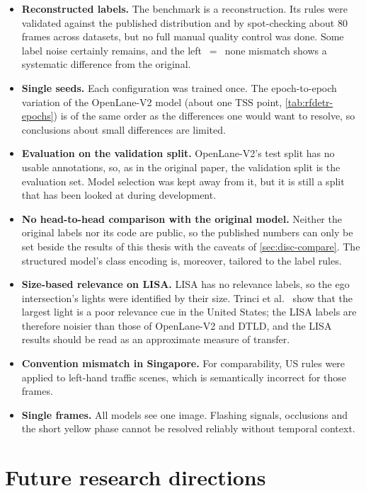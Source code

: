 \begin{itemize}
  \item \textbf{Reconstructed labels.} The benchmark is a reconstruction. Its rules were validated against
        the published distribution and by spot-checking about 80 frames across datasets, but no full
        manual quality control was done. Some label noise certainly remains, and the left~$=$~none
        mismatch shows a systematic difference from the original.
  \item \textbf{Single seeds.} Each configuration was trained once. The epoch-to-epoch variation of the
        OpenLane-V2 model (about one TSS point, \cref{tab:rfdetr-epochs}) is of the same order as the
        differences one would want to resolve, so conclusions about small differences are limited.
  \item \textbf{Evaluation on the validation split.} OpenLane-V2's test split has no usable annotations,
        so, as in the original paper, the validation split is the evaluation set. Model selection was
        kept away from it, but it is still a split that has been looked at during development.
  \item \textbf{No head-to-head comparison with the original model.} Neither the original labels nor
        its code are public, so the published numbers can only be set beside the results of this thesis
        with the caveats of \cref{sec:disc-compare}. The structured model's class encoding is, moreover,
        tailored to the label rules.
  \item \textbf{Size-based relevance on LISA.} LISA has no relevance labels, so the ego intersection's
        lights were identified by their size. Trinci et al.~\cite{trinci2026color} show that the
        largest light is a poor relevance cue in the United States; the LISA labels are therefore
        noisier than those of OpenLane-V2 and DTLD, and the LISA results should be read as an
        approximate measure of transfer.
  \item \textbf{Convention mismatch in Singapore.} For comparability, US rules were applied to left-hand
        traffic scenes, which is semantically incorrect for those frames.
  \item \textbf{Single frames.} All models see one image. Flashing signals, occlusions and the short
        yellow phase cannot be resolved reliably without temporal context.
\end{itemize}

\section{Future research directions}
\label{sec:disc-future}

